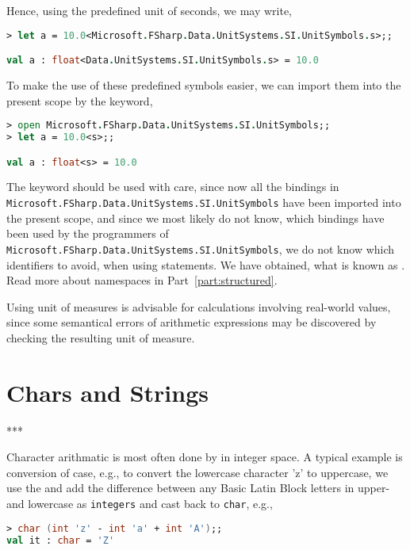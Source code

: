 Hence, using the predefined unit of seconds, we may write,
%
\begin{lstlisting}[language=fsharp,caption={fsharpi, SI unit of measures are built-in.}]
> let a = 10.0<Microsoft.FSharp.Data.UnitSystems.SI.UnitSymbols.s>;;

val a : float<Data.UnitSystems.SI.UnitSymbols.s> = 10.0
\end{lstlisting}
To make the use of these predefined symbols easier, we can import them into the present scope by the  keyword,
%
\begin{lstlisting}[language=fsharp,caption={fsharpi, simpler syntax by importing, but beware of namespace polution.}]
> open Microsoft.FSharp.Data.UnitSystems.SI.UnitSymbols;;
> let a = 10.0<s>;;

val a : float<s> = 10.0
\end{lstlisting}
The  keyword should be used with care, since now all the bindings in \lstinline|Microsoft.FSharp.Data.UnitSystems.SI.UnitSymbols| have been imported into the present scope, and since we most likely do not know, which bindings have been used by the programmers of \lstinline|Microsoft.FSharp.Data.UnitSystems.SI.UnitSymbols|, we do not know which identifiers to avoid, when using  statements. We have obtained, what is known as . Read more about namespaces in Part~\ref{part:structured}.

Using unit of measures is advisable for calculations involving real-world values, since some semantical errors of arithmetic expressions may be discovered by checking the resulting unit of measure.


\section{Chars and Strings}
***

Character arithmatic is most often done by in integer space. A typical example is conversion of case, e.g., to convert the lowercase character 'z' to uppercase, we use the  and add the difference between any Basic Latin Block letters in upper- and lowercase as \lstinline{integers} and cast back to \lstinline{char}, e.g.,
%
\begin{lstlisting}[language=fsharp,caption={fsharpi, converting case by casting and integer arithmatic.}]
> char (int 'z' - int 'a' + int 'A');; 
val it : char = 'Z'
\end{lstlisting}
%

